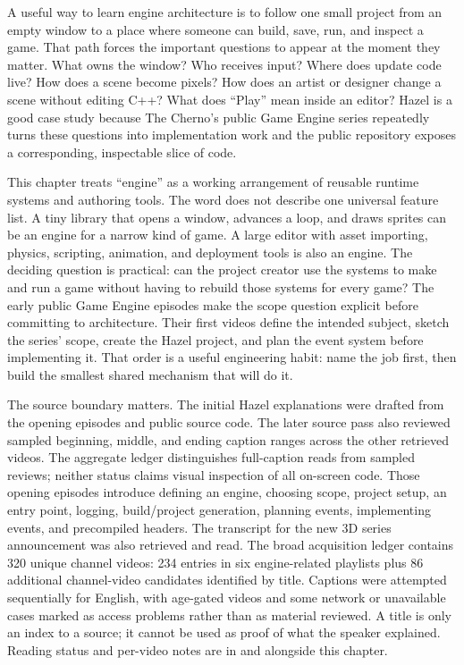 A useful way to learn engine architecture is to follow one small project from an empty window to a place where someone can build, save, run, and inspect a game. That path forces the important questions to appear at the moment they matter. What owns the window? Who receives input? Where does update code live? How does a scene become pixels? How does an artist or designer change a scene without editing C++? What does ``Play'' mean inside an editor? Hazel is a good case study because The Cherno's public Game Engine series repeatedly turns these questions into implementation work and the public repository exposes a corresponding, inspectable slice of code.

This chapter treats ``engine'' as a working arrangement of reusable runtime systems and authoring tools. The word does not describe one universal feature list. A tiny library that opens a window, advances a loop, and draws sprites can be an engine for a narrow kind of game. A large editor with asset importing, physics, scripting, animation, and deployment tools is also an engine. The deciding question is practical: can the project creator use the systems to make and run a game without having to rebuild those systems for every game? The early public Game Engine episodes make the scope question explicit before committing to architecture. Their first videos define the intended subject, sketch the series' scope, create the Hazel project, and plan the event system before implementing it. That order is a useful engineering habit: name the job first, then build the smallest shared mechanism that will do it.

The source boundary matters. The initial Hazel explanations were drafted from the opening episodes and public source code. The later source pass also reviewed sampled beginning, middle, and ending caption ranges across the other retrieved videos. The aggregate ledger distinguishes full-caption reads from sampled reviews; neither status claims visual inspection of all on-screen code. Those opening episodes introduce defining an engine, choosing scope, project setup, an entry point, logging, build/project generation, planning events, implementing events, and precompiled headers. The transcript for the new 3D series announcement was also retrieved and read. The broad acquisition ledger contains 320 unique channel videos: 234 entries in six engine-related playlists plus 86 additional channel-video candidates identified by title. Captions were attempted sequentially for English, with age-gated videos and some network or unavailable cases marked as access problems rather than as material reviewed. A title is only an index to a source; it cannot be used as proof of what the speaker explained. Reading status and per-video notes are in  and  alongside this chapter.

